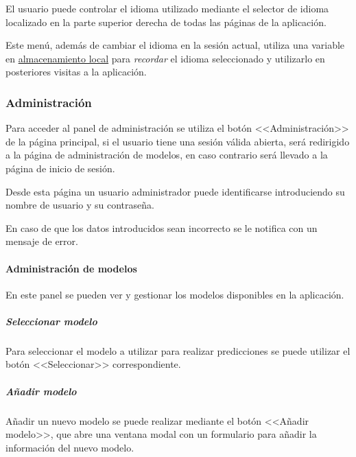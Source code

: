 El usuario puede controlar el idioma utilizado mediante el selector de idioma
localizado en la parte superior derecha de todas las páginas de la aplicación.


Este menú, además de cambiar el idioma en la sesión actual, utiliza una variable
en
\href{https://developer.mozilla.org/es/docs/Web/API/Window/localStorage}{almacenamiento
local} para \textit{recordar} el idioma seleccionado y utilizarlo en posteriores
visitas a la aplicación.

\subsubsection{Administración}

Para acceder al panel de administración se utiliza el botón <<Administración>>
de la página principal, si el usuario tiene una sesión válida abierta, será
redirigido a la página de administración de modelos, en caso contrario será
llevado a la página de inicio de sesión.


Desde esta página un usuario administrador puede identificarse introduciendo su
nombre de usuario y su contraseña.

En caso de que los datos introducidos sean incorrecto se le notifica con un
mensaje de error.


\paragraph{Administración de modelos}

En este panel se pueden ver y gestionar los modelos disponibles en la
aplicación.

\subparagraph{Seleccionar modelo}

Para seleccionar el modelo a utilizar para realizar predicciones se puede
utilizar el botón <<Seleccionar>> correspondiente.


\subparagraph{Añadir modelo}

Añadir un nuevo modelo se puede realizar mediante el botón <<Añadir modelo>>,
que abre una ventana modal con un formulario para añadir la información del
nuevo modelo.

